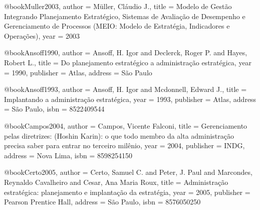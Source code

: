 %

@book{Muller2003,
  author = {Müller, Cláudio J.},
  title = {Modelo de Gestão Integrando Planejamento Estratégico, Sistemas de Avaliação de Desempenho e Gerenciamento de Processos (MEIO: Modelo de Estratégia, Indicadores e Operações)},
  year = {2003}
}

@book{Ansoff1990,
  author = {Ansoff, H. Igor and Declerck, Roger P. and Hayes, Robert L.},
  title = {Do planejamento estratégico a administração estratégica},
  year = {1990},
  publisher = {Atlas},
  address = {São Paulo}
}

@book{Ansoff1993,
  author = {Ansoff, H. Igor and Mcdonnell, Edward J.},
  title = {Implantando a administração estratégica},
  year = {1993},
  publisher = {Atlas},
  address = {São Paulo},
  isbn = {8522409544}
}

@book{Campos2004,
  author = {Campos, Vicente Falconi},
  title = {Gerenciamento pelas diretrizes: (Hoshin Karin): o que todo membro da alta administração precisa saber para entrar no terceiro milênio},
  year = {2004},
  publisher = {INDG},
  address = {Nova Lima},
  isbn = {8598254150}
}

@book{Certo2005,
  author = {Certo, Samuel C. and Peter, J. Paul and Marcondes, Reynaldo Cavalheiro and Cesar, Ana Maria Roux},
  title = {Administração estratégica: planejamento e implantação da estratégia},
  year = {2005},
  publisher = {Pearson Prentice Hall},
  address = {São Paulo},
  isbn = {8576050250}
}

